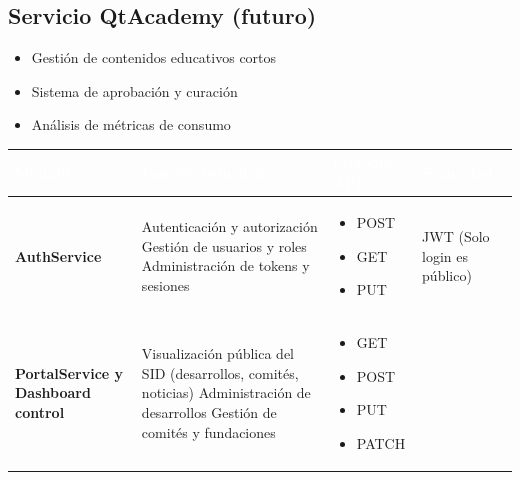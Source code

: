 \documentclass[11pt,a4paper]{article}
\newcommand{\headerStyle}[1]{\textcolor{white}{\textbf{#1}}}
\begin{document}
\subsection{Servicio QtAcademy (futuro)}
\begin{itemize}
	\item Gestión de contenidos educativos cortos
	\item Sistema de aprobación y curación
	\item Análisis de métricas de consumo
\end{itemize}


\begin{table}[H]
    \centering
    \renewcommand{\arraystretch}{1.5}
    \begin{tabular}{>{\raggedright\arraybackslash}p{2.8cm} >{\raggedright\arraybackslash}p{5.0cm} >{\raggedright\arraybackslash}p{3.0cm} >{\raggedright\arraybackslash}p{3.0cm}}
        \toprule
        \rowcolor{headercolor}
        \headerStyle{M{\'o}dulo} & \headerStyle{Función principal} & \headerStyle{Métodos API} & \headerStyle{Seguridad} \\
        \midrule
        \rowcolor{rowcolor1}
        \textbf{AuthService} & 
        Autenticación y autorización\newline
        Gestión de usuarios y roles\newline
        Administración de tokens y sesiones &
        \begin{itemize}[nosep,leftmargin=*]
            \item POST
            \item GET
            \item PUT
        \end{itemize} &
        JWT\newline
        (Solo login es público) \\
        \midrule
        \rowcolor{rowcolor2}
        \textbf{PortalService y Dashboard control} & 
        Visualización pública del SID\newline
        (desarrollos, comités, noticias)\newline
        Administración de desarrollos\newline
        Gestión de comités y fundaciones &
        \begin{itemize}[nosep,leftmargin=*]
            \item GET
            \item POST
            \item PUT
            \item PATCH

\end{itemize}
\end{tabular}
\end{table}
\end{document}
